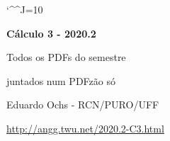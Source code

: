 \documentclass[oneside,12pt]{article}
\begin{document}

\def\drafturl{http://angg.twu.net/LATEX/2020-2-C3.pdf}
\def\drafturl{http://angg.twu.net/2020.2-C3.html}
\def\draftfooter{\tiny \href{\drafturl}{\jobname{}} \ColorBrown{\shorttoday{} \hours}}

\catcode`\^^J=10
\pu



%

\thispagestyle{empty}

\begin{center}

\vspace*{1.2cm}

{\bf \Large Cálculo 3 - 2020.2}

\bsk

Todos os PDFs do semestre

juntados num PDFzão só

\bsk

Eduardo Ochs - RCN/PURO/UFF

\url{http://angg.twu.net/2020.2-C3.html}

\end{center}

\newpage




\end{document}
